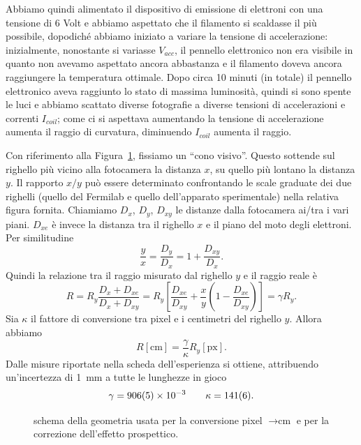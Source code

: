 \documentclass[10pt, a4paper, italian]{article}
\begin{document}
Abbiamo quindi alimentato il dispositivo di emissione di elettroni con una tensione di 6 Volt e abbiamo aspettato che il filamento si scaldasse il più possibile, dopodiché abbiamo iniziato a variare la tensione di accelerazione: inizialmente, nonostante si variasse $V_{acc}$, il pennello elettronico non era visibile in quanto non avevamo aspettato ancora abbastanza e il filamento doveva ancora raggiungere la temperatura ottimale. Dopo circa 10 minuti (in totale) il pennello elettronico aveva raggiunto lo stato di massima luminosità, quindi si sono spente le luci e abbiamo scattato diverse fotografie a diverse tensioni di accelerazioni e correnti $I_{coil}$; come ci si aspettava aumentando la tensione di accelerazione aumenta il raggio di curvatura, diminuendo $I_{coil}$ aumenta il raggio.

Con riferimento alla Figura~\ref{fig:conversione}, fissiamo un ``cono visivo''. Questo sottende sul righello più vicino alla fotocamera la distanza $ x $, su quello più lontano la distanza $ y $. Il rapporto $x/y$ può essere determinato confrontando le scale graduate dei due righelli (quello del Fermilab e quello dell'apparato sperimentale) nella relativa figura fornita. Chiamiamo $ D_{x} $, $ D_{y} $, $ D_{xy} $ le distanze dalla fotocamera ai/tra i vari piani. $ D_{xe} $ è invece la distanza tra il righello $ x $ e il piano del moto degli elettroni.
Per similitudine
\[ \frac{y}{x} = \frac{D_{y}}{D_{x}} = 1 + \frac{D_{xy}}{D_{x}}. \]
Quindi la relazione tra il raggio misurato dal righello $ y $ e il raggio reale è
\[
    R = R_{y} \frac{D_{x} + D_{xe}}{D_{x} + D_{xy}} =
    R_{y} \left[ \frac{D_{xe}}{D_{xy}} + \frac{x}{y} \left(1 - \frac{D_{xe}}{D_{xy}}\right) \right]
    = \gamma R_{y}.
\]
Sia $ \kappa $ il fattore di conversione tra pixel e i centimetri del righello $ y $. Allora abbiamo
\[ R[\si{\centi\meter}] = \frac{\gamma}{\kappa} R_{y}[\mathrm{px}]. \]
Dalle misure riportate nella scheda dell'esperienza si ottiene, attribuendo un'incertezza di \SI{1}{\milli\meter} a tutte le lunghezze in gioco
\[ \gamma = \num{ 906\pm 5 e-3 } \qquad \kappa = \num{ 141 \pm 6 }. \]

\begin{figure}[htbp]
    \centering
    
    \caption{\label{fig:conversione}schema della geometria usata per la conversione pixel $ \to \si{\centi\meter} $ e per la correzione dell'effetto prospettico.}
\end{figure}
\end{document}
